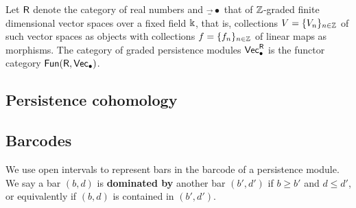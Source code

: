 Let $\mathsf{R}$ denote the category of real numbers and $\Vec_\bullet$ that of $\mathbb{Z}$-graded finite dimensional vector spaces over a fixed field $\Bbbk$, that is, collections $V = \{V_n\}_{n\in\mathbb{Z}}$ of such vector spaces as objects with collections $f = \{f_n\}_{n\in\mathbb{Z}}$ of linear maps as morphisms.
The category of graded persistence modules $\mathsf{Vec}_\bullet^{\mathsf{R}}$ is the functor category $\mathsf{Fun}(\mathsf{R}, \mathsf{Vec}_\bullet)$.

\subsection{Persistence cohomology}

\subsection{Barcodes}

We use open intervals to represent bars in the barcode of a persistence module. We say a bar $(b,d)$ is \textbf{dominated by} another bar $(b',d')$ if $b\geq b'$ and $d\leq d'$, or equivalently if $(b,d)$ is contained in $(b',d')$.

